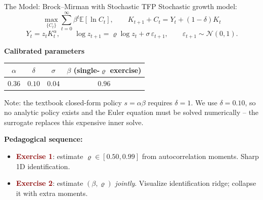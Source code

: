 \documentclass[10pt,aspectratio=169]{beamer}
\newcommand{\E}[1]{\mathbb{E}\!\left[#1\right]}
\newcommand{\emphc}[1]{\textbf{\textcolor{darkred}{#1}}}
\begin{document}
\begin{frame}{The Model: Brock--Mirman with Stochastic TFP}
\small
Stochastic growth model:
\vspace{-4pt}
\[
\max_{\{C_t\}} \sum_{t=0}^{\infty} \beta^t \E{\ln C_t}, \qquad
K_{t+1} + C_t = Y_t + (1-\delta)K_t
\]
\vspace{-12pt}
\[
Y_t = z_t K_t^\alpha, \qquad \log z_{t+1} = \varrho\log z_t + \sigma\,\varepsilon_{t+1}, \qquad \varepsilon_{t+1}\sim\mathcal{N}(0,1).
\]

\textbf{Calibrated parameters}
\begin{center}\begin{tabular}{cccc}
\toprule
$\alpha$ & $\delta$ & $\sigma$ & $\beta$ (single-$\varrho$ exercise) \\
\midrule
$0.36$ & $0.10$ & $0.04$ & $0.96$ \\
\bottomrule
\end{tabular}\end{center}
\vspace{-0.05cm}
{\scriptsize Note: the textbook closed-form policy $s = \alpha\beta$ requires $\delta = 1$. We use $\delta = 0.10$, so no analytic policy exists and the Euler equation must be solved numerically -- the surrogate replaces this expensive inner solve.}

\textbf{Pedagogical sequence:}
\begin{itemize}
\itemsep0pt
\item \emphc{Exercise 1}: estimate $\varrho \in [0.50, 0.99]$ from autocorrelation moments. Sharp 1D identification.
\item \emphc{Exercise 2}: estimate $(\beta, \varrho)$ \emph{jointly}. Visualize identification ridge; collapse it with extra moments.
\end{itemize}
\end{frame}
\end{document}
